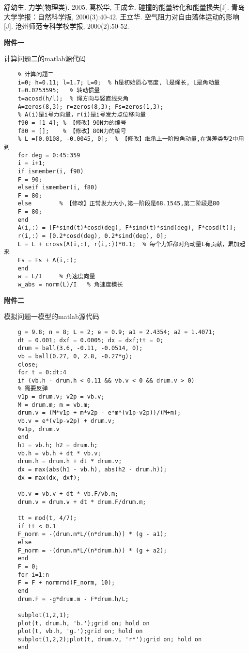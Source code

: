 \documentclass[withoutpreface,bwprint]{cumcmthesis} %
\begin{document}
\begin{thebibliography}{9}%
    舒幼生. 力学(物理类). 2005.
     葛松华, 王成金. 碰撞的能量转化和能量损失[J]. 青岛大学学报：自然科学版, 2000(3):40-42.
    王立华. 空气阻力对自由落体运动的影响[J]. 沧州师范专科学校学报, 2000(2):50-52.
\end{thebibliography}


\newpage
\textbf{{\Large 附件一}}

计算问题二的matlab源代码

\begin{lstlisting}
	% 计算问题二
	i=0; h=0.11; l=1.7; L=0;  % h是初始质心高度, l是绳长, L是角动量
	I=0.0253595;   % 转动惯量
	t=acosd(h/l);  % 绳方向与竖直线夹角
	A=zeros(8,3); r=zeros(8,3); Fs=zeros(1,3);
	% A(i)是i号力向量，r(i)是i号发力点位移向量
	f90 = [1 4]; % 【修改】90N力的编号
	f80 = [];    % 【修改】80N力的编号
	% L =[0.0108, -0.0045, 0];  % 【修改】继承上一阶段角动量,在误差类型2中用到
	for deg = 0:45:359
	i = i+1;
	if ismember(i, f90) 
	F = 90;
	elseif ismember(i, f80)
	F = 80;
	else        % 【修改】正常发力大小,第一阶段是68.1545,第二阶段是80
	F = 80;
	end
	A(i,:) = [F*sind(t)*cosd(deg), F*sind(t)*sind(deg), F*cosd(t)];
	r(i,:) = [0.2*cosd(deg), 0.2*sind(deg), 0];
	L = L + cross(A(i,:), r(i,:))*0.1;  % 每个力矩都对角动量L有贡献，累加起来
	Fs = Fs + A(i,:);
	end
	w = L/I     % 角速度向量
	w_abs = norm(L)/I   % 角速度模长
\end{lstlisting}

\newpage
\textbf{{\Large 附件二}}

模拟问题一模型的matlab源代码

\begin{lstlisting}
	g = 9.8; n = 8; L = 2; e = 0.9; a1 = 2.4354; a2 = 1.4071;
	dt = 0.001; dxf = 0.0005; dx = dxf;tt = 0;
	drum = ball(3.6, -0.11, -0.0514, 0);
	vb = ball(0.27, 0, 2.8, -0.27*g);
	close;
	for t = 0:dt:4
	if (vb.h - drum.h < 0.11 && vb.v < 0 && drum.v > 0) 
	% 需要反弹
	v1p = drum.v; v2p = vb.v;
	M = drum.m; m = vb.m;
	drum.v = (M*v1p + m*v2p - e*m*(v1p-v2p))/(M+m);
	vb.v = e*(v1p-v2p) + drum.v;
	%v1p, drum.v
	end
	h1 = vb.h; h2 = drum.h;
	vb.h = vb.h + dt * vb.v;
	drum.h = drum.h + dt * drum.v;
	dx = max(abs(h1 - vb.h), abs(h2 - drum.h));
	dx = max(dx, dxf);
	
	vb.v = vb.v + dt * vb.F/vb.m;
	drum.v = drum.v + dt * drum.F/drum.m;
	
	tt = mod(t, 4/7);
	if tt < 0.1
	F_norm = -(drum.m*L/(n*drum.h)) * (g - a1);
	else
	F_norm = -(drum.m*L/(n*drum.h)) * (g + a2);
	end
	F = 0;
	for i=1:n
	F = F + normrnd(F_norm, 10);
	end
	drum.F = -g*drum.m - F*drum.h/L;
	
	subplot(1,2,1);
	plot(t, drum.h, 'b.');grid on; hold on
	plot(t, vb.h, 'g.');grid on; hold on
	subplot(1,2,2);plot(t, drum.v, 'r*');grid on; hold on
	end

\end{lstlisting}
\end{document}
